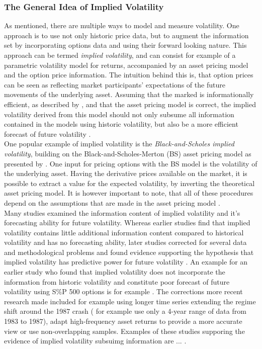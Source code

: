 \subsubsection{The General Idea of Implied Volatility}
As mentioned, there are multiple ways to model and measure volatility. One approach is to use not only historic price data, but to augment the information set by incorporating options data and using their forward looking nature. This approach can be termed \emph{implied volatility}, and can consist for example of a parametric volatility model for returns, accompanied by an asset pricing model and the option price information\parencite{andersen2001}. The intuition behind this is, that option prices can be seen as reflecting market participants' expectations of the future movements of the underlying asset. Assuming that the marked is informationally efficient, as described by \textcite{fama1970}, and that the asset pricing model is correct, the implied volatility derived from this model should not only subsume all information contained in the models using historic volatility, but also be a more efficient forecast of future volatility \parencite{jiang2005}. \\
One popular example of implied volatility is the \emph{Black-and-Scholes implied volatility}, building on the Black-and-Scholes-Merton (\gls{BS}) asset pricing model as presented by \textcite{black1973}. One input for pricing options with the \gls{BS} model is the volatility of the underlying asset. Having the derivative prices available on the market, it is possible to extract a value for the expected volatility, by inverting the theoretical asset pricing model. It is however important to note, that all of these procedures depend on the assumptions that are made in the asset pricing model \parencite{andersen2001}. \\
Many studies examined the information content of implied volatility and it's forecasting ability for future volatility. Whereas earlier studies find that implied volatility contains little additional information content compared to historical volatility and has no forecasting ability, later studies corrected for several data and methodological problems and found evidence supporting the hypothesis that implied volatility has predictive power for future volatility \parencite{jiang2005}. An example for an earlier study who found that implied volatility does not incorporate the information from historic volatility and constitute poor forecast of future volatility using S\%P 500 options is for example \textcite{canina1993}. The corrections more recent research made included for example using longer time series extending the regime shift around the 1987 crash (\textcite{ canina1993} for example use only a 4-year range of data from 1983 to 1987), adapt high-frequency asset returns to provide a more accurate view or use non-overlapping samples. Examples of these studies supporing the evidence of implied volatility subsuimg information are ... \parencite{jiang2005}. \\

